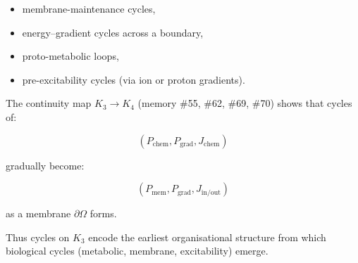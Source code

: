 \begin{itemize}
  \item membrane-maintenance cycles,
  \item energy–gradient cycles across a boundary,
  \item proto-metabolic loops,
  \item pre-excitability cycles (via ion or proton gradients).
\end{itemize}

The continuity map $K_3\to K_4$ (memory \#55, \#62, \#69, \#70)
shows that cycles of:

\[
  (P_{\mathrm{chem}}, P_{\mathrm{grad}}, J_{\mathrm{chem}})
\]

gradually become:

\[
  (P_{\mathrm{mem}}, P_{\mathrm{grad}}, J_{\mathrm{in/out}})
\]

as a membrane $\partial\Omega$ forms.

Thus cycles on $K_3$ encode the earliest organisational structure 
from which biological cycles (metabolic, membrane, excitability)
emerge.
